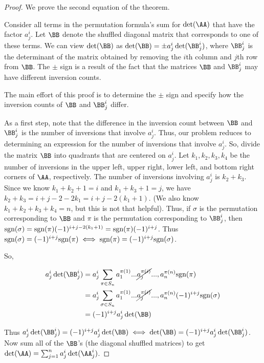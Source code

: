 \begin{proof}
    We prove the second equation of the theorem.
    
    Consider all terms in the permutation formula's sum for $\det(\AA)$ that have the factor $a^i_j$. Let $\BB$ denote the shuffled diagonal matrix that corresponds to one of these terms. We can view $\det(\BB)$ as $\det(\BB) = \pm a^i_j \det(\BB^i_j)$, where $\BB^i_j$ is the determinant of the matrix obtained by removing the $i$th column and $j$th row from $\BB$. The $\pm$ sign is a result of the fact that the matrices $\BB$ and $\BB^i_j$ may have different inversion counts.

    The main effort of this proof is to determine the $\pm$ sign and specify how the inversion counts of $\BB$ and $\BB^i_j$ differ.
    
    As a first step, note that the difference in the inversion count between $\BB$ and $\BB^i_j$ is the number of inversions that involve $a^i_j$. Thus, our problem reduces to determining an expression for the number of inversions that involve $a^i_j$. So, divide the matrix $\BB$ into quadrants that are centered on $a^i_j$. Let $k_1, k_2, k_3, k_4$ be the number of inversions in the upper left, upper right, lower left, and bottom right corners of $\AA$, respectively. The number of inversions involving $a^i_j$ is $k_2 + k_3$. Since we know $k_1 + k_2 + 1 = i$ and $k_1 + k_3 + 1 = j$, we have $k_2 + k_3 = i + j - 2 - 2k_1 = i + j - 2(k_1 + 1)$. (We also know $k_1 + k_2 + k_3 + k_4 = n$, but this is not that helpful). Thus, if $\sigma$ is the permutation corresponding to $\BB$ and $\pi$ is the permutation corresponding to $\BB^i_j$, then $\text{sgn}(\sigma) = \text{sgn}(\pi)(-1)^{i + j - 2(k_1 + 1)} = \text{sgn}(\pi)(-1)^{i + j}$. Thus $\text{sgn}(\sigma) = (-1)^{i + j}\text{sgn}(\pi) \iff \text{sgn}(\pi) = (-1)^{i + j}\text{sgn}(\sigma)$. 
    
    So,
    
    \begin{align*}
        a^i_j \det(\BB^i_j) &= a^i_j \sum_{\pi \in S_n} a^{\pi(1)}_1 ... \cancel{a^{\pi(i)}_j} ..., a^{\pi(n)}_n \sgn(\pi) \\
        &= a^i_j \sum_{\sigma \in S_n} a^{\pi(1)}_1 ... \cancel{a^{\pi(i)}_j} ..., a^{\pi(n)}_n (-1)^{i + j} \sgn(\sigma) \\
        &= (-1)^{i + j} a^i_j \det(\BB)
    \end{align*}
    
    Thus $a^i_j \det(\BB^i_j) = (-1)^{i + j} a^i_j \det(\BB) \iff \det(\BB) = (-1)^{i + j} a^i_j \det(\BB^i_j)$. Now sum all of the $\BB$'s (the diagonal shuffled matrices) to get $\det(\AA) = \sum_{j = 1}^{n} a^i_j \det(\AA^i_j)$.
\end{proof}
    
